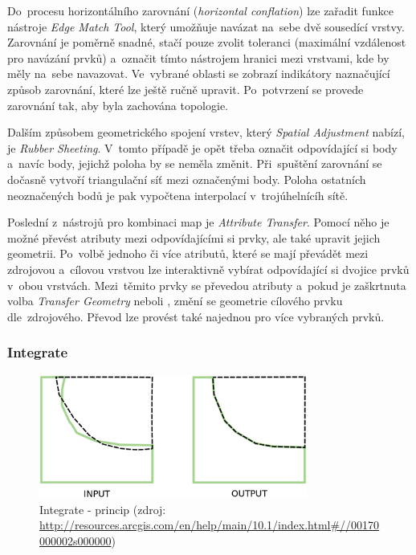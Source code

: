 Do~procesu horizontálního zarovnání (\textit{horizontal conflation}) lze 
zařadit funkce nástroje \textit{Edge Match Tool}, který umožňuje navázat 
na~sebe dvě sousedící vrstvy. Zarovnání je poměrně snadné, stačí pouze 
zvolit toleranci (maximální vzdálenost pro navázání prvků) a~označit tímto
nástrojem hranici mezi vrstvami, kde by měly na~sebe navazovat. Ve~vybrané
oblasti se zobrazí indikátory naznačující způsob zarovnání, které lze ještě
ručně upravit. Po~potvrzení se provede zarovnání tak, aby byla zachována
topologie.

Dalším způsobem geometrického spojení vrstev, který \textit{Spatial Adjustment}
nabízí, je \textit{Rubber Sheeting}. V~tomto případě je opět třeba označit 
odpovídající si body a~navíc body, jejichž poloha by se neměla změnit. 
Při~spuštění zarovnání se dočasně vytvoří triangulační síť mezi označenými body. 
Poloha ostatních neoznačených bodů je pak vypočtena interpolací v~trojúhelnícíh 
sítě.

Poslední z~nástrojů pro kombinaci map je \textit{Attribute Transfer}. Pomocí 
něho je možné převést atributy mezi odpovídajícími si prvky, ale také upravit
jejich geometrii. Po~volbě jednoho či více atributů, které se mají převádět 
mezi zdrojovou a~cílovou vrstvou lze interaktivně vybírat odpovídající si 
dvojice prvků v~obou vrstvách. Mezi~těmito prvky se převedou atributy a~pokud
je zaškrtnuta volba \textit{Transfer Geometry} neboli ,
změní se geometrie cílového prvku dle~zdrojového. Převod lze provést také 
najednou pro více vybraných prvků.

\subsubsection{Integrate}

  \begin{figure}[H]
    \centering
      \includegraphics[width=250pt]{./pictures/integrate.png}
      \caption[Integrate - princip]{Integrate - princip 
	  (zdroj: \url{http://resources.arcgis.com/en/help/main/10.1/index.html\#//00170000002s000000})}
      \label{fig:integrate}
  \end{figure}

